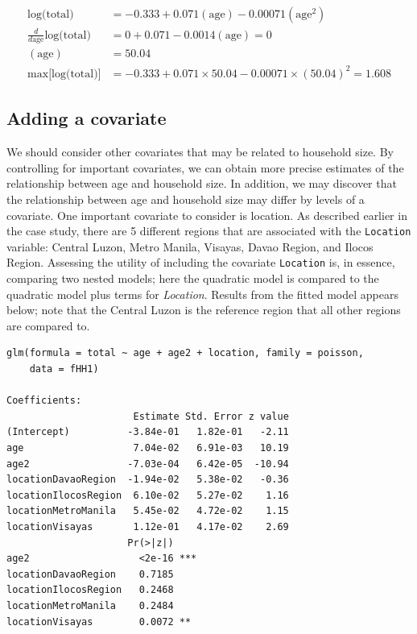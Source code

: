 \documentclass[
]{krantz}
\begin{document}
\begin{align}
\textrm{log(total)} & = -0.333 + 0.071(\textrm{age}) - 0.00071 (\textrm{age}^2) \\
\frac{d}{d\textrm{age}}\textrm{log(total)} & = 0 + 0.071 - 0.0014 (\textrm{age}) = 0 \\
(\textrm{age}) & = 50.04 \\
\textrm{max[log(total)]} & = -0.333 + 0.071 \times 50.04 - 0.00071 \times (50.04)^2 = 1.608
\end{align}

\hypertarget{adding-a-covariate}{%
\subsection{Adding a covariate}\label{adding-a-covariate}}

We should consider other covariates that may be related to household size. By controlling for important covariates, we can obtain more precise estimates of the relationship between age and household size. In addition, we may discover that the relationship between age and household size may differ by levels of a covariate. One important covariate to consider is location. As described earlier in the case study, there are 5 different regions that are associated with the \texttt{Location} variable: Central Luzon, Metro Manila, Visayas, Davao Region, and Ilocos Region. Assessing the utility of including the covariate \texttt{Location} is, in essence, comparing two nested models; here the quadratic model is compared to the quadratic model plus terms for \emph{Location}. Results from the fitted model appears below; note that the Central Luzon is the reference region that all other regions are compared to.

\begin{verbatim}
glm(formula = total ~ age + age2 + location, family = poisson, 
    data = fHH1)

Coefficients:
                      Estimate Std. Error z value
(Intercept)          -3.84e-01   1.82e-01   -2.11
age                   7.04e-02   6.91e-03   10.19
age2                 -7.03e-04   6.42e-05  -10.94
locationDavaoRegion  -1.94e-02   5.38e-02   -0.36
locationIlocosRegion  6.10e-02   5.27e-02    1.16
locationMetroManila   5.45e-02   4.72e-02    1.15
locationVisayas       1.12e-01   4.17e-02    2.69
                     Pr(>|z|)    
age2                   <2e-16 ***
locationDavaoRegion    0.7185    
locationIlocosRegion   0.2468    
locationMetroManila    0.2484    
locationVisayas        0.0072 ** 
\end{verbatim}
\end{document}
